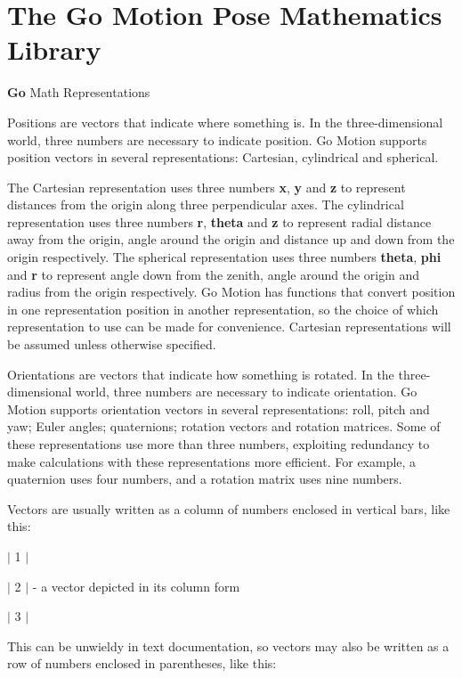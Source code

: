 \hypertarget{group___g_o_m_a_t_h}{\section{The Go Motion Pose Mathematics Library}
\label{group___g_o_m_a_t_h}
}
{\bfseries Go} Math Representations

Positions are vectors that indicate where something is. In the three-\/dimensional world, three numbers are necessary to indicate position. Go Motion supports position vectors in several representations\-: Cartesian, cylindrical and spherical.

The Cartesian representation uses three numbers {\bfseries x}, {\bfseries y} and {\bfseries z} to represent distances from the origin along three perpendicular axes. The cylindrical representation uses three numbers {\bfseries r}, {\bfseries theta} and {\bfseries z} to represent radial distance away from the origin, angle around the origin and distance up and down from the origin respectively. The spherical representation uses three numbers {\bfseries theta}, {\bfseries phi} and {\bfseries r} to represent angle down from the zenith, angle around the origin and radius from the origin respectively. Go Motion has functions that convert position in one representation position in another representation, so the choice of which representation to use can be made for convenience. Cartesian representations will be assumed unless otherwise specified.

Orientations are vectors that indicate how something is rotated. In the three-\/dimensional world, three numbers are necessary to indicate orientation. Go Motion supports orientation vectors in several representations\-: roll, pitch and yaw; Euler angles; quaternions; rotation vectors and rotation matrices. Some of these representations use more than three numbers, exploiting redundancy to make calculations with these representations more efficient. For example, a quaternion uses four numbers, and a rotation matrix uses nine numbers.

Vectors are usually written as a column of numbers enclosed in vertical bars, like this\-:

$\vert$ 1 $\vert$ \par
 $\vert$ 2 $\vert$ -\/ a vector depicted in its column form \par
 $\vert$ 3 $\vert$

This can be unwieldy in text documentation, so vectors may also be written as a row of numbers enclosed in parentheses, like this\-:


